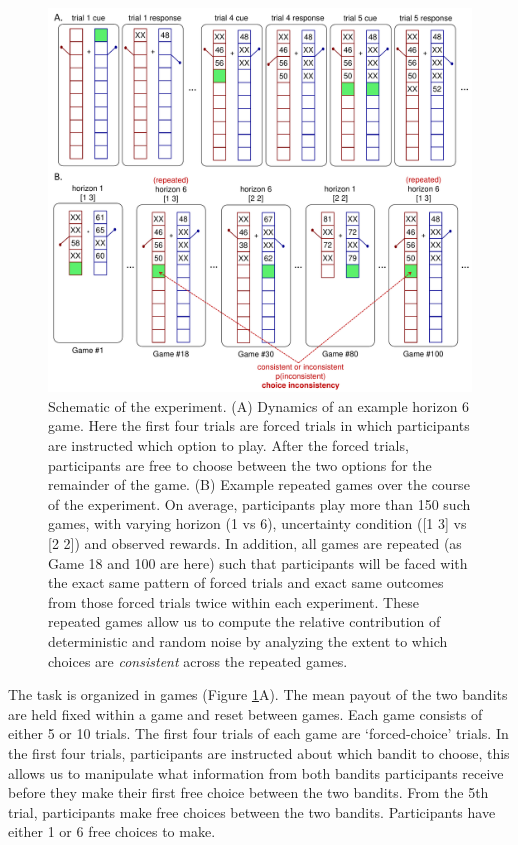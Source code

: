 \documentclass[12pt]{article}
\begin{document}
{	\begin{figure}[hp]
		\begin{center}
			\includegraphics[width=\textwidth]{figures/taskfiga.pdf}
			\caption{ 
				Schematic of the experiment. (A) Dynamics of an example horizon 6 game.  Here the first four trials are forced trials in which participants are instructed which option to play.  After the forced trials, participants are free to choose between the two options for the remainder of the game.  (B) Example repeated games over the course of the experiment.
				On average, participants play more than 150 such games, with varying horizon (1 vs 6), uncertainty condition ([1 3] vs [2 2]) and observed rewards.  In addition, all games are repeated (as Game 18 and 100 are here) such that participants will be faced with the exact same pattern of forced trials and exact same outcomes from those forced trials twice within each experiment.  These repeated games allow us to compute the relative contribution of deterministic and random noise by analyzing the extent to which choices are {\em consistent} across the repeated games.}
			\label{fig:taskfig}
		\end{center}
	\end{figure}
	
	The task is organized in games (Figure \ref{fig:taskfig}A). The mean payout of the two bandits are held fixed within a game and reset between games. Each game consists of either 5 or 10 trials. The first four trials of each game are `forced-choice' trials. In the first four trials, participants are instructed about which bandit to choose, this allows us to manipulate what information from both bandits participants receive before they make their first free choice between the two bandits. From the 5th trial, participants make free choices between the two bandits. Participants have either 1 or 6 free choices to make. 
	
}
\end{document}
